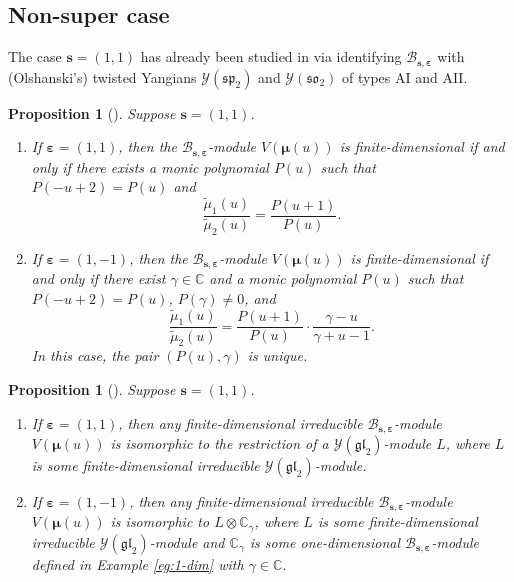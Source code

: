 \documentclass[11pt,reqno]{amsart}
\numberwithin{equation}{section}
\newtheorem{prop}[thm]{Proposition}
\theoremstyle{definition}
\theoremstyle{remark}
\newcommand{\C}{\mathbb{C}}
\newcommand{\gl}{\mathfrak{gl}}
\newcommand{\bC}{\mathbb{C}}
\newcommand{\tl}{\tilde}
\newcommand{\BMN}{{\mathscr{B}_{\bm s,\bm \ve}}}
\newcommand{\ve}{\varepsilon}
\begin{document}
\subsection{Non-super case}
The case $\bm s=(1,1)$ has already been studied in \cite[Propositions 4.4, 4.5]{Molev2002reflection} via identifying $\BMN$ with (Olshanski's) twisted Yangians $\mathscr Y(\mathfrak{sp}_2)$ and $\mathscr Y(\mathfrak{so}_2)$ of types AI and AII.


\begin{prop}[{\cite{Molev2002reflection}}]\label{prop:iff-even}
Suppose $\bm s=(1,1)$.
\begin{enumerate}
    \item If $\bm\ve=(1,1)$, then the $\BMN$-module $V(\bm\mu(u))$ is finite-dimensional if and only if there exists a monic polynomial $P(u)$ such that $P(-u+2)=P(u)$ and
\[
\frac{\tl \mu_1(u)}{\tl \mu_2(u)}=\frac{P(u+1)}{P(u)}.
\]
\item If $\bm\ve=(1,-1)$, then the $\BMN$-module $V(\bm\mu(u))$ is finite-dimensional if and only if there exist $\gamma\in \C$ and a monic polynomial $P(u)$ such that $P(-u+2)=P(u)$, $P(\gamma)\ne 0$, and
\[
\frac{\tl \mu_1(u)}{\tl \mu_2(u)}=\frac{P(u+1)}{P(u)}\cdot \frac{\gamma -u}{\gamma+u-1}.
\]
In this case, the pair $(P(u),\gamma)$ is unique.
\end{enumerate}
\end{prop}

\begin{prop}[{\cite{Molev2002reflection}}]\label{prop:con-even}
Suppose $\bm s=(1,1)$.
\begin{enumerate}
\item If $\bm\ve=(1,1)$, then any finite-dimensional irreducible $\BMN$-module $V(\bm\mu(u))$ is isomorphic to the restriction of a $\mathscr Y(\gl_2)$-module $L$, where $L$ is some finite-dimensional irreducible $\mathscr Y(\gl_2)$-module.
\item If $\bm\ve=(1,-1)$, then any finite-dimensional irreducible $\BMN$-module $V(\bm\mu(u))$ is isomorphic to $L\otimes \bC_\gamma$, where $L$ is some finite-dimensional irreducible $\mathscr Y(\gl_2)$-module and $\bC_\gamma$ is some one-dimensional $\BMN$-module defined in Example \ref{eg:1-dim} with $\gamma\in\bC$.
\end{enumerate}
\end{prop}
\end{document}
